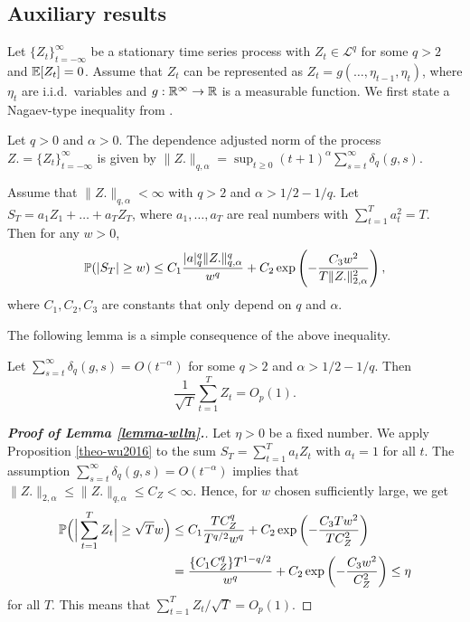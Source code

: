 \documentclass[12pt]{article}
\begin{document}
\subsection*{Auxiliary results}\label{subsec:appendix:aux}


Let $\{Z_t\}_{t=-\infty}^\infty$ be a stationary time series process with $Z_t \in \mathcal{L}^q$ for some $q > 2$ and $\mathbb{E}[Z_t] = 0$. Assume that $Z_t$ can be represented as $Z_t = g(\ldots, \eta_{t-1}, \eta_t)$, where $\eta_t$ are i.i.d.\ variables and $g: \mathbb{R}^\infty \to \mathbb{R}$ is a measurable function. We first state a Nagaev-type inequality from \cite{Wu2016}. 


\begin{definitionA}\label{defA-DAN} 
Let $q > 0$ and $\alpha > 0$. The dependence adjusted norm of the process $Z. = \{Z_t\}_{t=-\infty}^\infty$ is given by 
$\|Z.\|_{q, \alpha} = \sup_{t\geq 0} (t+1)^{\alpha} \sum_{s=t}^{\infty} \delta_{q}(g,s)$.
\end{definitionA}


\begin{propA}\label{theo-wu2016}
Assume that $\|Z.\|_{q, \alpha} < \infty$ with $q > 2$ and $\alpha > 1/2 - 1/q$. Let $S_T = a_1 Z_1 + \ldots + a_T Z_T$, where $a_1,\ldots,a_T$ are real numbers with $\sum_{t=1}^T a_t^2 = T$. Then for any $w>0$,
\[ \mathbb{P}(|S_T| \geq w) \leq C_1 \frac{|a|_{q}^{q}\|Z.\|^{q}_{q, \alpha}}{w^{q}} + C_2 \exp \left( - \frac{C_3 w^2} {T \|Z.\|^2_{2, \alpha}}\right), \]
where $C_1, C_2, C_3$ are constants that only depend on $q$ and $\alpha$.
\end{propA}


The following lemma is a simple consequence of the above inequality. 


\begin{lemmaA}\label{lemma-wlln}
Let $\sum_{s=t}^\infty \delta_{q}(g,s) = O(t^{-\alpha})$ for some $q > 2$ and $\alpha > 1/2 - 1/q$. Then 
\[ \frac{1}{\sqrt{T}} \sum_{t=1}^T Z_t = O_p(1). \]
\end{lemmaA} 


\begin{proof}[\textnormal{\textbf{Proof of Lemma \ref{lemma-wlln}.}}]
Let $\eta > 0$ be a fixed number. We apply Proposition \ref{theo-wu2016} to the sum $S_T = \sum_{t=1}^T a_t Z_t$ with $a_t = 1$ for all $t$. The assumption $\sum_{s=t}^\infty \delta_{q}(g,s) = O(t^{-\alpha})$ implies that $\|Z.\|_{2, \alpha} \le \|Z.\|_{q, \alpha} \le C_Z < \infty$. Hence, for $w$ chosen sufficiently large, we get 
\begin{align*}
\mathbb{P}\Big( \Big| \sum_{t=1}^T Z_t \Big| \geq \sqrt{T} w\Big) 
 & \leq C_1 \frac{T C_Z^q}{T^{q/2} w^q} + C_2 \exp \left( - \frac{C_3 T w^2} {T C_Z^2}\right) \\
 & = \frac{\{C_1 C_Z^q\} T^{1-q/2}}{w^q} + C_2 \exp \left( - \frac{C_3 w^2} {C_Z^2}\right) \le \eta
\end{align*}
for all $T$. This means that $\sum_{t=1}^T Z_t / \sqrt{T} = O_p(1)$. 
\end{proof}
\end{document}
